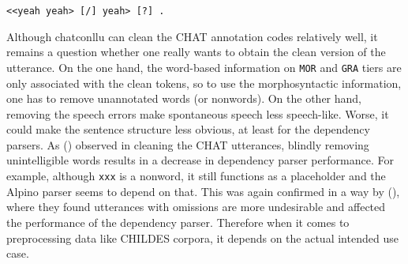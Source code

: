 \texttt{<<yeah yeah> [/] yeah> [?] .}

Although chatconllu can clean the CHAT annotation codes relatively well, it remains a question whether one really wants to obtain the clean version of the utterance. On the one hand, the word-based information on \texttt{MOR} and \texttt{GRA} tiers are only associated with the clean tokens, so to use the morphosyntactic information, one has to remove unannotated words (or nonwords). On the other hand, removing the speech errors make spontaneous speech less speech-like. Worse, it could make the sentence structure less obvious, at least for the dependency parsers. As (\cite{odijk2018anncor}) observed in cleaning the CHAT utterances, blindly removing unintelligible words results in a decrease in dependency parser performance. For example, although \texttt{xxx} is a nonword, it still functions as a placeholder  and the Alpino parser seems to depend on that. This was again confirmed in a way by (\cite{liu2021}), where they found utterances with omissions are more undesirable and affected the performance of the dependency parser. Therefore when it comes to preprocessing data like CHILDES corpora, it depends on the actual intended use case.
